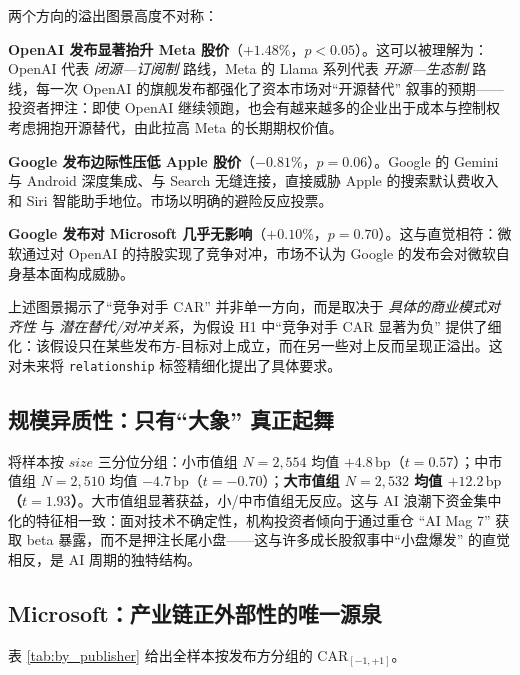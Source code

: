 \documentclass[11pt]{ctexart}
\begin{document}
两个方向的溢出图景高度不对称：

\textbf{OpenAI 发布显著抬升 Meta 股价}（$+1.48\%$，$p<0.05$）。这可以被理解为：OpenAI 代表 \emph{闭源—订阅制} 路线，Meta 的 Llama 系列代表 \emph{开源—生态制} 路线，每一次 OpenAI 的旗舰发布都强化了资本市场对“开源替代” 叙事的预期——投资者押注：即使 OpenAI 继续领跑，也会有越来越多的企业出于成本与控制权考虑拥抱开源替代，由此拉高 Meta 的长期期权价值。

\textbf{Google 发布边际性压低 Apple 股价}（$-0.81\%$，$p=0.06$）。Google 的 Gemini 与 Android 深度集成、与 Search 无缝连接，直接威胁 Apple 的搜索默认费收入和 Siri 智能助手地位。市场以明确的避险反应投票。

\textbf{Google 发布对 Microsoft 几乎无影响}（$+0.10\%$，$p=0.70$）。这与直觉相符：微软通过对 OpenAI 的持股实现了竞争对冲，市场不认为 Google 的发布会对微软自身基本面构成威胁。

上述图景揭示了“竞争对手 CAR” 并非单一方向，而是取决于 \emph{具体的商业模式对齐性} 与 \emph{潜在替代/对冲关系}，为假设 H1 中“竞争对手 CAR 显著为负” 提供了细化：该假设只在某些发布方-目标对上成立，而在另一些对上反而呈现正溢出。这对未来将 \texttt{relationship} 标签精细化提出了具体要求。

\subsection{规模异质性：只有“大象” 真正起舞}

将样本按 $size$ 三分位分组：小市值组 $N=2{,}554$ 均值 $+4.8\,\text{bp}$（$t=0.57$）；中市值组 $N=2{,}510$ 均值 $-4.7\,\text{bp}$（$t=-0.70$）；\textbf{大市值组 $N=2{,}532$ 均值 $+12.2\,\text{bp}$（$t=1.93$）}。大市值组显著获益，小/中市值组无反应。这与 AI 浪潮下资金集中化的特征相一致：面对技术不确定性，机构投资者倾向于通过重仓 “AI Mag 7” 获取 beta 暴露，而不是押注长尾小盘——这与许多成长股叙事中“小盘爆发” 的直觉相反，是 AI 周期的独特结构。

\subsection{Microsoft：产业链正外部性的唯一源泉}

表 \ref{tab:by_publisher} 给出全样本按发布方分组的 CAR$_{[-1,+1]}$。
\end{document}
